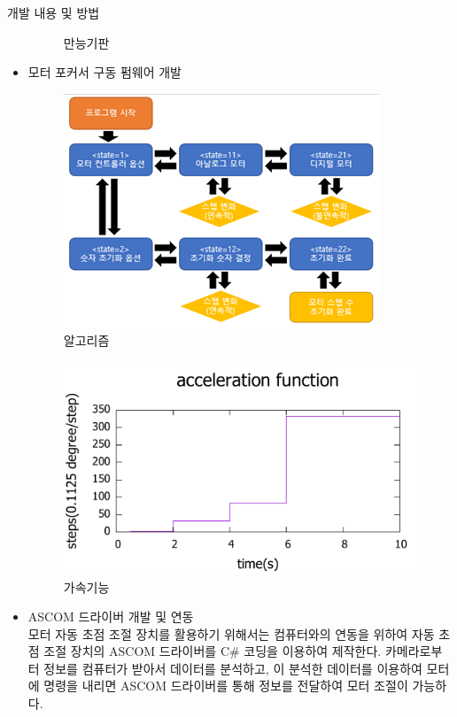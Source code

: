 \documentclass{gshs_poster_beamer}
\begin{document}
\begin{columns}[T]
\begin{posterbox}[colbacktitle=blue!50!black,coltitle=white,colback=cyan!5]{개발 내용 및 방법}
\begin{itemize}
\begin{figure}[h]
		\caption{만능기판}
		\label{fig:circuit1}
	\end{figure}
	\item 모터 포커서 구동 펌웨어 개발\\
	\begin{figure}[h]
		\centering
		\includegraphics[scale=0.8]{algorithm}
		\caption{알고리즘}
		\label{fig:algorithm}
	\end{figure}
	\begin{figure}[h]
		\centering
		\includegraphics[scale=0.5]{function}
		\caption{가속기능}
		\label{fig:function}
	\end{figure}
	\item ASCOM 드라이버 개발 및 연동\\
	모터 자동 초점 조절 장치를 활용하기 위해서는 컴퓨터와의 연동을 위하여 자동 초점 조절 장치의 ASCOM 드라이버를 C\# 코딩을 이용하여 제작한다. 카메라로부터 정보를 컴퓨터가 받아서 데이터를 분석하고, 이 분석한 데이터를 이용하여 모터에 명령을 내리면 ASCOM 드라이버를 통해 정보를 전달하여 모터 조절이 가능하다.
  \end{itemize}
\end{posterbox}


\end{columns}
\end{document}
